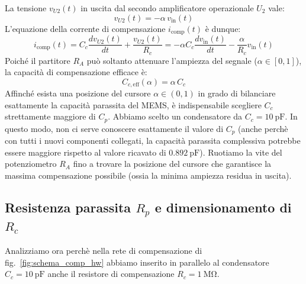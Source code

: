 \documentclass[11pt,a4paper]{article}
\begin{document}
\noindent La tensione $v_{U2}(t)$ in uscita dal secondo amplificatore operazionale $U_2$ vale:
\begin{equation}
    \label{eq:vU2_definizione}
    v_{U2}(t) = -\alpha \, v_{\text{in}}(t)
\end{equation}
L'equazione della corrente di compensazione $i_{\text{comp}}(t)$ è dunque:
\begin{equation}
    \label{eq:icomp_da_vU2}
    i_{\text{comp}}(t) = C_c \frac{dv_{U2}(t)}{dt} + \frac{v_{U2}(t)}{R_c} = -\alpha C_c \frac{dv_{\text{in}}(t)}{dt} - \frac{\alpha}{R_c} v_{\text{in}}(t)
\end{equation}
Poiché il partitore $R_A$ può soltanto attenuare l'ampiezza del segnale ($\alpha \in [0, 1]$), la capacità di compensazione efficace è:
\begin{equation}
    C_{c,\text{eff}}(\alpha) = \alpha \, C_c
\end{equation}
Affinché esista una posizione del cursore $\alpha \in (0, 1)$ in grado di bilanciare esattamente la capacità parassita del MEMS, è indispensabile scegliere $C_c$ strettamente maggiore di $C_p$. Abbiamo scelto un condensatore da $C_c = \SI{10}{\pico\farad}$. In questo modo, non ci serve conoscere esattamente il valore di $C_p$ (anche perchè con tutti i nuovi componenti collegati, la capacità parassita complessiva potrebbe essere maggiore rispetto al valore ricavato di $\SI{0.892}{\pico\farad}$). Ruotiamo la vite del potenziometro $R_A$ fino a trovare la posizione del cursore che garantisce la massima compensazione possibile (ossia la minima ampiezza residua in uscita).

\subsection{Resistenza parassita \texorpdfstring{$R_p$}{Rp} e dimensionamento di \texorpdfstring{$R_c$}{Rc}}
\label{subsec:ruolo_rp_scope}

Analizziamo ora perchè nella rete di compensazione di fig.~\ref{fig:schema_comp_hw} abbiamo inserito in parallelo al condensatore $C_c = \SI{10}{\pico\farad}$ anche il resistore di compensazione $R_c = \SI{1}{\mega\ohm}$.

\vspace{0.3cm}
\end{document}
